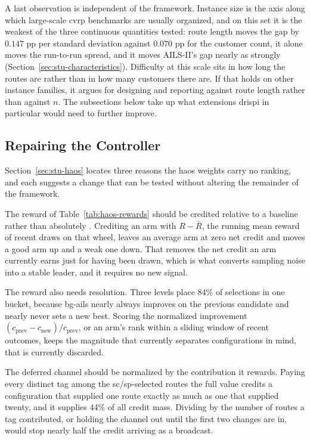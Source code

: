 A last observation is independent of the framework.  Instance size is the axis
along which large-scale \gls{cvrp} benchmarks are usually organized, and on this set
it is the weakest of the three continuous quantities tested: route length moves
the gap by $0.147$ pp per standard deviation against $0.070$ pp for the customer
count, it alone moves the run-to-run spread, and it moves AILS-II's gap nearly
as strongly (Section~\ref{sec:stu-characteristics}).  Difficulty at this
scale sits in how long the routes are rather than in how many customers there
are.  If that holds on other instance families, it argues for designing and
reporting against route length rather than against $n$.  The subsections below
take up what extensions \gls{drispi} in particular would need to further improve.

\subsection{Repairing the Controller}
\label{sec:con-controller}

Section~\ref{sec:stu-haos} locates three reasons the \gls{haos} weights carry no
ranking, and each suggests a change that can be tested without altering the remainder
of the framework.

The reward of Table~\ref{tab:haos-rewards} should be credited relative to a
baseline rather than absolutely \citep{fialhoAnalyzingBanditbasedAdaptive2010}. Crediting an arm with $R - \bar{R}$, the
running mean reward of recent draws on that wheel, leaves an average arm at zero
net credit and moves a good arm up and a weak one down. That removes the net credit
an arm currently earns just for having been drawn, which is what converts sampling
noise into a stable leader, and it requires no new signal.

The reward also needs resolution. Three levels place 84\% of selections in one
bucket, because \gls{bg-ails} nearly always improves on the previous candidate and
nearly never sets a new best. Scoring the normalized improvement
$(c_{\text{prev}} - c_{\text{new}})/c_{\text{prev}}$, or an arm's rank within a
sliding window of recent outcomes, keeps the magnitude that currently separates
configurations in mind, that is currently discarded.

The deferred channel should be normalized by the contribution it rewards.
Paying every distinct tag among the \gls{sc}/\gls{sp}-selected routes the full value credits
a configuration that supplied one route exactly as much as one that supplied
twenty, and it supplies 44\% of all credit mass. Dividing by the number of
routes a tag contributed, or holding the channel out until the first two changes
are in, would stop nearly half the credit arriving as a broadcast.

